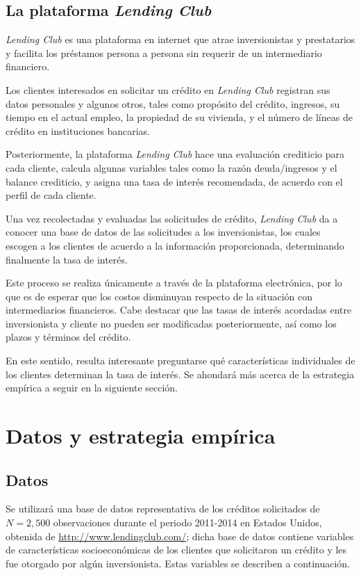 \documentclass[12pt, fleqn, letterpaper, oneside]{amsart}
\begin{document}
\subsection{La plataforma \emph{Lending Club}}

\emph{Lending Club} es una plataforma en internet que atrae inversionistas y prestatarios y facilita los préstamos persona a persona sin requerir de un intermediario financiero. 

Los clientes interesados en solicitar un crédito en \emph{Lending Club} registran sus datos personales y algunos otros, tales como propósito del crédito, ingresos, su tiempo en el actual empleo, la propiedad de su vivienda, y el número de líneas de crédito en instituciones bancarias. 

Posteriormente, la plataforma \emph{Lending Club} hace una evaluación crediticio para cada cliente, calcula algunas variables tales como la razón deuda/ingresos y el balance crediticio, y asigna una tasa de interés recomendada, de acuerdo con el perfil de cada cliente. 

Una vez recolectadas y evaluadas las solicitudes de crédito, \emph{Lending Club} da a conocer una base de datos de las solicitudes a los inversionistas, los cuales escogen a los clientes de acuerdo a la información proporcionada, determinando finalmente la tasa de interés. 

Este proceso se realiza únicamente a través de la plataforma electrónica, por lo que es de esperar que los costos disminuyan respecto de la situación con intermediarios financieros. Cabe destacar que las tasas de interés acordadas entre inversionista y cliente no pueden ser modificadas posteriormente, así como los plazos y términos del crédito. 

En este sentido, resulta interesante preguntarse qué características individuales de los clientes determinan la tasa de interés. Se ahondará más acerca de la estrategia empírica a seguir en la siguiente sección. 

\section{Datos y estrategia empírica}

\subsection{Datos}
Se utilizará una base de datos representativa de los créditos solicitados de $N = 2,500$ observaciones durante el periodo 2011-2014 en Estados Unidos,  obtenida de \url{http://www.lendingclub.com/}; dicha base de datos contiene variables de características socioeconómicas de los clientes que solicitaron un crédito y les fue otorgado por algún inversionista. Estas variables se describen a continuación. 
\end{document}
